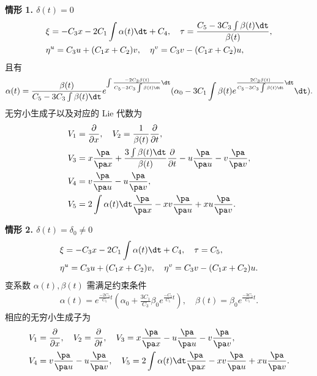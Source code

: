 \noindent \textbf{情形 1. $\delta(t)=0$}
\begin{align*}
&\xi=-C_3 x-2C_1\int\alpha(t)\dt+C_4,\quad \tau=\frac{C_5-3C_3\int\beta(t)\dt}{\beta(t)},\\
&\eta^u=C_3 u+(C_1x+C_2)v,\quad \eta^v=C_3 v-(C_1x+C_2)u,
\end{align*}
且有
\begin{equation*}
\alpha(t)=\frac{\beta(t)}{C_5-3C_3\int\beta(t)\dt} e^{\int\frac{-2C_3\beta(t)}{C_5-3C_3\int\beta(t)\dt}\dt} (\alpha_0-3C_1\int\beta(t)e^{\frac{2C_3\beta(t)}{C_5-3C_3\int\beta(t)\dt}\dt}\dt).
\end{equation*}
无穷小生成子以及对应的 Lie 代数为
\begin{align*}
&V_1=\frac{\partial}{\partial x},\quad V_2=\frac{1}{\beta(t)}\frac{\partial}{\partial t},\\
&V_3=x\frac{\pa}{\pa x}+\frac{3\int\beta(t)\dt}{\beta(t)}\frac{\partial}{\partial t}-u\frac{\pa}{\pa u}-v\frac{\pa}{\pa v},\\
&V_4=v\frac{\pa}{\pa u}-u\frac{\pa}{\pa v},\\
&V_5=2\int \alpha(t)\dt\frac{\pa}{\pa x}-xv\frac{\pa}{\pa u}+xu\frac{\pa}{\pa v}.
\end{align*}


\noindent \textbf{情形 2. $\delta(t)=\delta_0\neq0$}
\begin{align*}
&\xi=-C_3 x-2C_1\int\alpha(t)\dt+C_4,\quad \tau=C_5,\\
&\eta^u=C_3 u+(C_1x+C_2)v,\quad \eta^v=C_3 v-(C_1x+C_2)u.
\end{align*}
变系数 $\alpha(t), \beta(t)$ 需满足约束条件
\begin{align*}
\alpha(t)=e^{\frac{-2C_3}{C_5}t}(\alpha_0+\frac{3C_1}{C_3}\beta_0e^{\frac{-C_3}{C_5}t}),\quad \beta(t)=\beta_0e^{\frac{-3C_3}{C_5}t}.
\end{align*}
相应的无穷小生成子为
\begin{align*}
&V_1=\frac{\partial}{\partial x},\quad V_2=\frac{\partial}{\partial t},\quad
V_3=x\frac{\pa}{\pa x}-u\frac{\pa}{\pa u}-v\frac{\pa}{\pa v},\\
&V_4=v\frac{\pa}{\pa u}-u\frac{\pa}{\pa v},\quad
V_5=2\int \alpha(t)\dt\frac{\pa}{\pa x}-xv\frac{\pa}{\pa u}+xu\frac{\pa}{\pa v}.
\end{align*}


